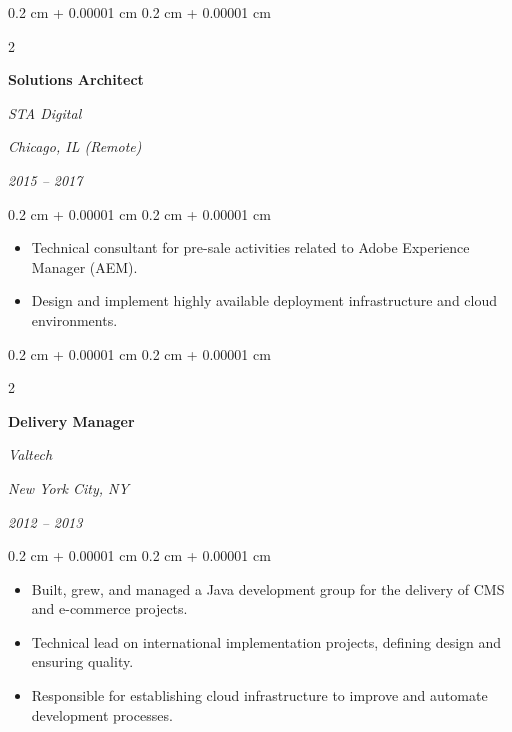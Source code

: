 \documentclass[10pt, a4paper]{article}
\newenvironment{highlights}{
    \begin{itemize}[
        topsep=0.10 cm,
        parsep=0.10 cm,
        partopsep=0pt,
        itemsep=0pt,
        leftmargin=0.4 cm + 10pt
    ]
}{
    \end{itemize}
} %
\newenvironment{onecolentry}{
    \begin{adjustwidth}{
        0.2 cm + 0.00001 cm
    }{
        0.2 cm + 0.00001 cm
    }
}{
    \end{adjustwidth}
} %
\newenvironment{twocolentry}[2][6cm]{ %
    \onecolentry
    \def\secondColumn{#2}
    \setcolumnwidth{\fill, #1} %
    \begin{paracol}{2}
}{
    \switchcolumn \raggedleft \secondColumn
    \end{paracol}
    \endonecolentry
} %
\begin{document}
\vspace{0.20 cm}



%
%
\begin{twocolentry}{
        \textit{Chicago, IL (Remote)}

        \textit{2015 – 2017}}
    \textbf{Solutions Architect}

    \textit{STA Digital}
\end{twocolentry}

\vspace{0.10 cm}
\begin{onecolentry}
    \begin{highlights}
        \item Technical consultant for pre-sale activities related to Adobe Experience Manager (AEM).
        \item Design and implement highly available deployment infrastructure and cloud environments.
    \end{highlights}
\end{onecolentry}

\vspace{0.20 cm}



%
%
\begin{twocolentry}{
        \textit{New York City, NY}

        \textit{2012 – 2013}}
    \textbf{Delivery Manager}

    \textit{Valtech}
\end{twocolentry}

\vspace{0.10 cm}
\begin{onecolentry}
    \begin{highlights}
        \item Built, grew, and managed a Java development group for the delivery of CMS and e-commerce projects.
        \item Technical lead on international implementation projects, defining design and ensuring quality.
        \item Responsible for establishing cloud infrastructure to improve and automate development processes.
    \end{highlights}
\end{onecolentry}

\vspace{0.20 cm}
\end{document}
